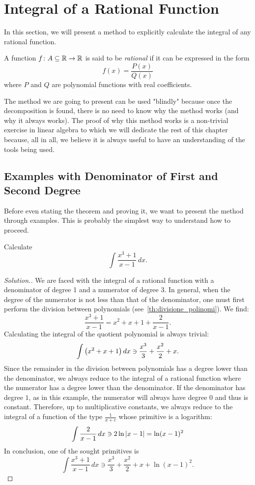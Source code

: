 \section{Integral of a Rational Function}
%
In this section, we will present a method to explicitly calculate the integral
of any rational function.
%
%

\begin{definition}
%
%
%
A function $f\colon A \subseteq {\mathbb R} \to {\mathbb R}$
is said to be \emph{rational} if it can be expressed in the form
\[
  f(x) = \frac{P(x)}{Q(x)}
\]
where $P$ and $Q$ are polynomial functions with real coefficients.
\end{definition}

The method we are going to present can be used "blindly" because once the
decomposition is found, there is no need to know why the method works (and why
it always works).
The proof of why this method works is a non-trivial exercise in linear algebra
to which we will dedicate the rest of this chapter because, all in all, we
believe it is always useful to have an understanding of the tools being used.

\subsection{Examples with Denominator of First and Second Degree}

Before even stating the theorem and proving it, we want to present the method
through examples.
This is probably the simplest way to understand how to proceed.

\begin{example}
  Calculate 
  \[
  \int \frac{x^3+1}{x-1}\, dx.  
  \]
\end{example}
\begin{proof}[Solution.]
We are faced with the integral of a rational function with a denominator of
degree 1 and a numerator of degree 3.
In general, when the degree of the numerator is not less than that of the
denominator, one must first perform the division between polynomials
(see~\ref{th:divisione_polinomi}). We find:
\[
\frac{x^3+1}{x-1} = x^2 + x + 1 + \frac{2}{x-1}.
\]
Calculating the integral of the quotient polynomial is always trivial:
\[
\int {\left( x^2+x+1 \right)}  \, dx \ni \frac{x^3}{3} + \frac{x^2}{2} + x.
\]
Since the remainder in the division between polynomials has a degree lower than
the denominator, we always reduce to the integral of a rational function where
the numerator has a degree lower than the denominator.
If the denominator has degree $1$, as in this example, the numerator will always
have degree $0$ and thus is constant.
Therefore, up to multiplicative constants, we always reduce to the integral of a
function of the type $\frac{1}{x+c}$ whose primitive is a logarithm:
\[
 \int \frac{2}{x-1}\, dx \ni 2 \ln {\left|x-1\right|} = \ln (x-1)^2
\]
In conclusion, one of the sought primitives is 
\[
  \int \frac{x^3+1}{x-1}\, dx \ni \frac{x^3}{3} + \frac{x^2}{2} + x + \ln (x-1)^2.
\]
\end{proof}

